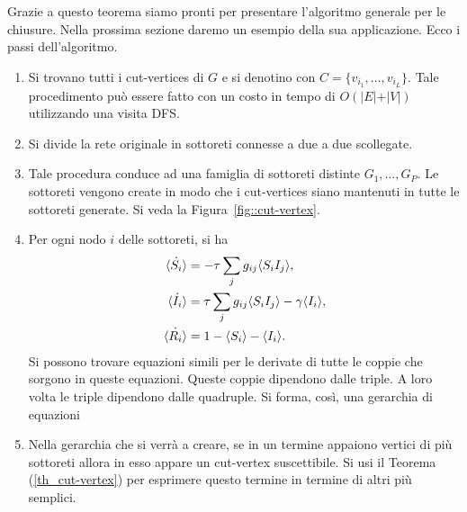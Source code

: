 Grazie a questo teorema siamo pronti per presentare l'algoritmo generale per le chiusure. Nella prossima sezione daremo un esempio della sua applicazione.
Ecco i passi dell'algoritmo.
\begin{enumerate}
	\item Si trovano tutti i cut-vertices di $G$ e si denotino con $C=\{ v_{i_1}, \dots, v_{i_L}\}$. Tale procedimento pu\`o essere fatto con  un costo in tempo di $O(\vert E \vert + \vert V \vert)$ utilizzando una visita DFS. 
	\item Si divide la rete originale in sottoreti connesse a due a due scollegate.\\
	\item Tale procedura conduce ad una famiglia di sottoreti distinte $G_1, \dots, G_P$. Le sottoreti vengono create in modo che i cut-vertices siano mantenuti in tutte le sottoreti generate. Si veda la Figura~\ref{fig::cut-vertex}.
	\item Per ogni nodo $i$ delle sottoreti, si ha 
	\begin{equation*}
	\begin{aligned}
\dot{\langle S_i \rangle} &= -\tau \sum_j g_{ij} \langle S_iI_j \rangle,\\
\dot{\langle I_i \rangle} &= \tau \sum_j g_{ij} \langle S_iI_j \rangle-\gamma\langle I_i \rangle,\\
\dot{\langle R_i \rangle} &= 1 -\langle S_i \rangle -\langle I_i \rangle.
		\end{aligned}
	\end{equation*}
	Si possono trovare  equazioni simili per le derivate di tutte le coppie che sorgono in queste equazioni. Queste coppie dipendono dalle triple. A loro volta le triple dipendono dalle quadruple. Si forma, cos\`i, una gerarchia di equazioni
	\item Nella gerarchia che si verr\`a a creare, se in un termine appaiono   vertici di pi\`u sottoreti allora in esso appare un cut-vertex suscettibile. Si usi il Teorema (\ref{th_cut-vertex}) per esprimere questo termine    in termine di altri pi\`u semplici.\\ 
\end{enumerate}
\newpage

